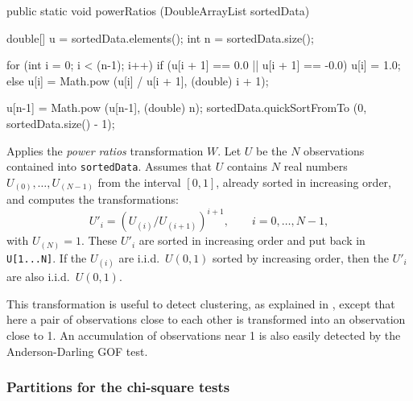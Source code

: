 \begin{code}

   public static void powerRatios (DoubleArrayList sortedData)\begin{hide} {

      double[] u = sortedData.elements();
      int n = sortedData.size();

      for (int i = 0; i < (n-1); i++) {
         if (u[i + 1] == 0.0 || u[i + 1] == -0.0)
            u[i] = 1.0;
         else
            u[i] = Math.pow (u[i] / u[i + 1], (double) i + 1);
      }

      u[n-1] = Math.pow (u[n-1], (double) n);
      sortedData.quickSortFromTo (0, sortedData.size() - 1);
   }\end{hide}
\end{code}
 \begin{tabb}  Applies the {\em power ratios\/} transformation $W$.
   Let $U$ be the $N$ observations contained into \texttt{sortedData}.
   Assumes that $U$ contains $N$ real numbers
   $U_{(0)},\dots,U_{(N-1)}$ from the interval $[0,1]$,
   already sorted in increasing order, and computes the transformations:
     $$ U'_i = (U_{(i)} / U_{(i+1)})^{i+1}, \qquad  i=0,\dots,N-1,$$
   with $U_{(N)} = 1$.
   These $U'_i$ are sorted in increasing order and put back in
   \texttt{U[1...N]}.
   If the $U_{(i)}$ are i.i.d.\ $U (0,1)$ sorted by increasing order,
   then the $U'_i$ are also i.i.d.\ $U (0,1)$.

  This transformation is useful to detect clustering, as explained in
  ,
   except that here a pair of
  observations close to each other is transformed
  into an observation close to 1.
  An accumulation of observations near 1 is also easily detected by
  the Anderson-Darling GOF test.
 \end{tabb}
\begin{htmlonly}
\end{htmlonly}


\subsubsection*{Partitions for the chi-square tests}

